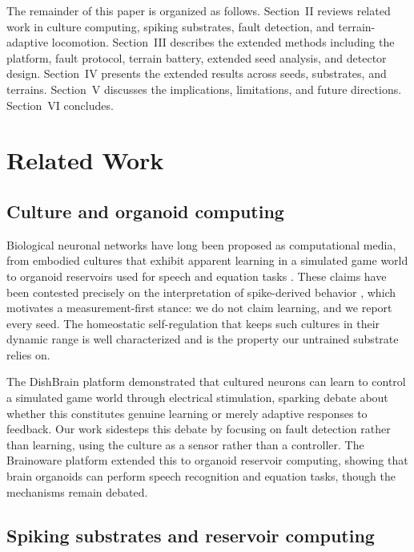 The remainder of this paper is organized as follows. Section~II reviews
related work in culture computing, spiking substrates, fault detection, and
terrain-adaptive locomotion. Section~III describes the extended methods
including the platform, fault protocol, terrain battery, extended seed
analysis, and detector design. Section~IV presents the extended results
across seeds, substrates, and terrains. Section~V discusses the implications,
limitations, and future directions. Section~VI concludes.

\section{Related Work}

\subsection{Culture and organoid computing}

Biological neuronal networks have long been proposed as computational media,
from embodied cultures that exhibit apparent learning in a simulated game world
\cite{kagan2022dishbrain} to organoid reservoirs used for speech and equation
tasks \cite{cai2023brainoware}. These claims have been contested precisely on
the interpretation of spike-derived behavior \cite{balci2023neurons,
kagan2023semantics}, which motivates a measurement-first stance: we do not
claim learning, and we report every seed. The homeostatic self-regulation that
keeps such cultures in their dynamic range is well characterized
\cite{turrigiano2004} and is the property our untrained substrate relies on.

The DishBrain platform \cite{kagan2022dishbrain} demonstrated that cultured
neurons can learn to control a simulated game world through electrical
stimulation, sparking debate about whether this constitutes genuine learning
or merely adaptive responses to feedback. Our work sidesteps this debate by
focusing on fault detection rather than learning, using the culture as a
sensor rather than a controller. The Brainoware platform \cite{cai2023brainoware}
extended this to organoid reservoir computing, showing that brain organoids can
perform speech recognition and equation tasks, though the mechanisms remain
debated.

\subsection{Spiking substrates and reservoir computing}

